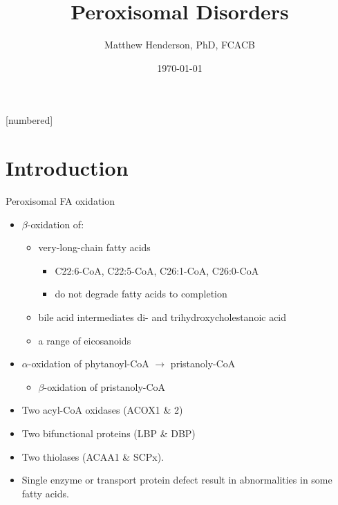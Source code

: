 \documentclass[presentation, smaller]{beamer}
\author{Matthew Henderson, PhD, FCACB}
\date{\today}
\title{Peroxisomal Disorders}
\institute[NSO]{Newborn Screening Ontario | The University of Ottawa}
\begin{document}
\maketitle


\vspace{220pt}
\beamertemplatenavigationsymbolsempty
{}[numbered]

\section{Introduction}
\label{sec:orgae95cfb}
\begin{frame}[label={sec:orgcd9547c}]{Peroxisomal FA oxidation}
\begin{itemize}
\item \(\beta\)-oxidation of:
\begin{itemize}
\item very-long-chain fatty acids
\begin{itemize}
\item C22:6-CoA, C22:5-CoA, C26:1-CoA, C26:0-CoA
\item do not degrade fatty acids to completion
\end{itemize}
\item bile acid intermediates di- and trihydroxycholestanoic acid
\item a range of eicosanoids
\end{itemize}
\item \(\alpha\)-oxidation of phytanoyl-CoA \(\to\) pristanoly-CoA
\begin{itemize}
\item \(\beta\)-oxidation of pristanoly-CoA
\end{itemize}

\item Two acyl-CoA oxidases (ACOX1 \& 2)
\item Two bifunctional proteins (LBP \& DBP)
\item Two thiolases (ACAA1 \& SCPx).
\item Single enzyme or transport protein defect result in abnormalities in some fatty acids.
\end{itemize}
\end{frame}
\end{document}
